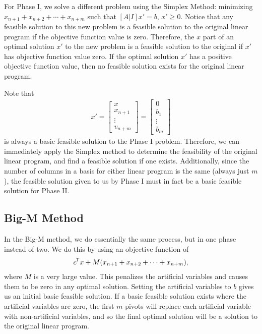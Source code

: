 For Phase I, we solve a different problem using the Simplex Method: minimizing $x_{n+1} + x_{n+2} + \cdots + x_{n+m}$ such that $[A|I]x' = b$, $x' \geq 0$. Notice that any feasible solution to this new problem is a feasible solution to the original linear program if the objective function value is zero. Therefore, the $x$ part of an optimal solution $x'$ to the new problem is a feasible solution to the original if $x'$ has objective function value zero. If the optimal solution $x'$ has a positive objective function value, then no feasible solution exists for the original linear program.

Note that
\begin{align*}
    x' = \begin{bmatrix}
        x \\
        x_{n+1} \\
        \vdots \\
        v_{n+m}
    \end{bmatrix} = \begin{bmatrix}
        0 \\
        b_1 \\
        \vdots \\
        b_m
    \end{bmatrix}
\end{align*}
is always a basic feasible solution to the Phase I problem. Therefore, we can immediately apply the Simplex method to determine the feasibility of the original linear program, and find a feasible solution if one exists. Additionally, since the number of columns in a basis for either linear program is the same (always just $m$), the feasible solution given to us by Phase I must in fact be a basic feasible solution for Phase II.

\subsection{Big-M Method}

In the Big-M method, we do essentially the same process, but in one phase instead of two. We do this by using an objective function of
\begin{align*}
    c^{\mkern-1.5mu\mathsf{T}}x + M(x_{n+1} + x_{n+2} + \cdots + x_{n+m}),
\end{align*}
where $M$ is a very large value. This penalizes the artificial variables and causes them to be zero in any optimal solution. Setting the artificial variables to $b$ gives us an initial basic feasible solution. If a basic feasible solution exists where the artificial variables are zero, the first $m$ pivots will replace each artificial variable with non-artificial variables, and so the final optimal solution will be a solution to the original linear program.

